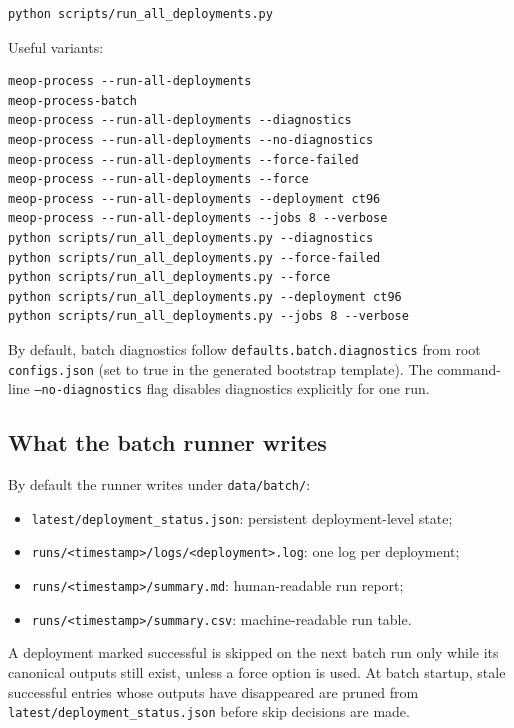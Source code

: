 \documentclass[11pt,a4paper]{article}
\newcommand{\pkg}[1]{\texttt{#1}}
\begin{document}
\begin{lstlisting}[style=meopcode]
python scripts/run_all_deployments.py
\end{lstlisting}

Useful variants:

\begin{lstlisting}[style=meopcode]
meop-process --run-all-deployments
meop-process-batch
meop-process --run-all-deployments --diagnostics
meop-process --run-all-deployments --no-diagnostics
meop-process --run-all-deployments --force-failed
meop-process --run-all-deployments --force
meop-process --run-all-deployments --deployment ct96
meop-process --run-all-deployments --jobs 8 --verbose
python scripts/run_all_deployments.py --diagnostics
python scripts/run_all_deployments.py --force-failed
python scripts/run_all_deployments.py --force
python scripts/run_all_deployments.py --deployment ct96
python scripts/run_all_deployments.py --jobs 8 --verbose
\end{lstlisting}

By default, batch diagnostics follow \pkg{defaults.batch.diagnostics} from root \pkg{configs.json} (set to true in the generated bootstrap template). The command-line \pkg{--no-diagnostics} flag disables diagnostics explicitly for one run.

\subsection{What the batch runner writes}

By default the runner writes under \pkg{data/batch/}:

\begin{itemize}[leftmargin=1.5em]
  \item \pkg{latest/deployment\_status.json}: persistent deployment-level state;
  \item \pkg{runs/<timestamp>/logs/<deployment>.log}: one log per deployment;
  \item \pkg{runs/<timestamp>/summary.md}: human-readable run report;
  \item \pkg{runs/<timestamp>/summary.csv}: machine-readable run table.
\end{itemize}

A deployment marked successful is skipped on the next batch run only while its canonical outputs still exist, unless a force option is used. At batch startup, stale successful entries whose outputs have disappeared are pruned from \pkg{latest/deployment\_status.json} before skip decisions are made.
\end{document}
